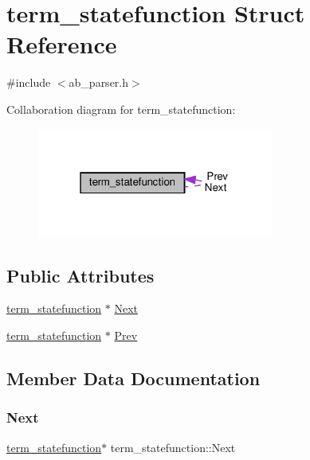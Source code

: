 \hypertarget{structterm__statefunction}{}\section{term\+\_\+statefunction Struct Reference}
\label{structterm__statefunction}


{\ttfamily \#include $<$ab\+\_\+parser.\+h$>$}



Collaboration diagram for term\+\_\+statefunction\+:
\nopagebreak
\begin{figure}[H]
\begin{center}
\leavevmode
\includegraphics[width=220pt]{dd/d3e/structterm__statefunction__coll__graph}
\end{center}
\end{figure}
\subsection*{Public Attributes}
\begin{DoxyCompactItemize}
\item 
\hyperlink{structterm__statefunction}{term\+\_\+statefunction} $\ast$ \hyperlink{structterm__statefunction_a326dae1852433ae2fc11195dd1770ddf}{Next}
\item 
\hyperlink{structterm__statefunction}{term\+\_\+statefunction} $\ast$ \hyperlink{structterm__statefunction_a2693cbcd59a8a1eea7cbc1f8a61efc83}{Prev}
\end{DoxyCompactItemize}


\subsection{Member Data Documentation}
\mbox{\label{structterm__statefunction_a326dae1852433ae2fc11195dd1770ddf}} 
\subsubsection{\texorpdfstring{Next}{Next}}
{\footnotesize\ttfamily \hyperlink{structterm__statefunction}{term\+\_\+statefunction}$\ast$ term\+\_\+statefunction\+::\+Next}

